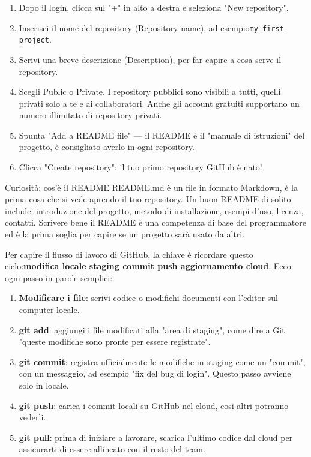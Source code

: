 
\begin{enumerate}
  \item Dopo il login, clicca sul "+" in alto a destra e seleziona "New repository".
  \item Inserisci il nome del repository (Repository name), ad esempio\texttt{my-\allowbreak first-\allowbreak project}.
  \item Scrivi una breve descrizione (Description), per far capire a cosa serve il repository.
  \item Scegli Public o Private. I repository pubblici sono visibili a tutti, quelli privati solo a te e ai collaboratori. Anche gli account gratuiti supportano un numero illimitato di repository privati.
  \item Spunta "Add a README file" — il README è il "manuale di istruzioni" del progetto, è consigliato averlo in ogni repository.
  \item Clicca "Create repository": il tuo primo repository GitHub è nato!
\end{enumerate}

\begin{tcbinfo}{Curiosità: cos'è il README}
README.md è un file in formato Markdown, è la prima cosa che si vede aprendo il tuo repository. Un buon README di solito include: introduzione del progetto, metodo di installazione, esempi d'uso, licenza, contatti. Scrivere bene il README è una competenza di base del programmatore ed è la prima soglia per capire se un progetto sarà usato da altri.

\end{tcbinfo}


Per capire il flusso di lavoro di GitHub, la chiave è ricordare questo ciclo:\textbf{modifica locale staging commit push aggiornamento cloud}. Ecco ogni passo in parole semplici:

\begin{enumerate}
  \item \textbf{Modificare i file}: scrivi codice o modifichi documenti con l'editor sul computer locale.
  \item \textbf{git add}: aggiungi i file modificati alla "area di staging", come dire a Git "queste modifiche sono pronte per essere registrate".
  \item \textbf{git commit}: registra ufficialmente le modifiche in staging come un "commit", con un messaggio, ad esempio "fix del bug di login". Questo passo avviene solo in locale.
  \item \textbf{git push}: carica i commit locali su GitHub nel cloud, così altri potranno vederli.
  \item \textbf{git pull}: prima di iniziare a lavorare, scarica l'ultimo codice dal cloud per assicurarti di essere allineato con il resto del team.
\end{enumerate}

